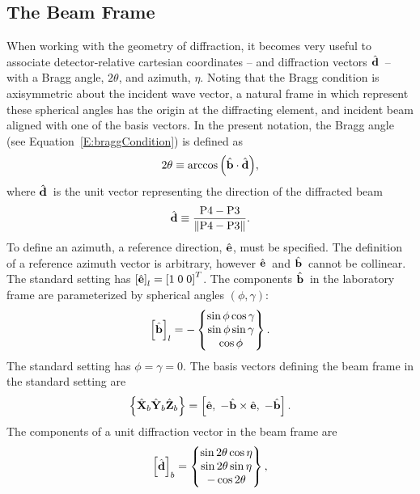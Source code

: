 \documentclass[12pt,letterpaper,final]{amsart}
\newcommand{\mbm}[1]{\ensuremath{\mbox{\boldmath$#1$}}}
\newcommand{\bhat}{\ensuremath{\hat{\mbm{\mathrm{b}}}}}
\newcommand{\dhat}{\ensuremath{\hat{\mbm{\mathrm{d}}}}}
\newcommand{\ehat}{\ensuremath{\hat{\mbm{\mathrm{e}}}}}
\newcommand{\Pthree}{\ensuremath{\mathrm{P3}}}
\newcommand{\Pfour}{\ensuremath{\mathrm{P4}}}
\newcommand{\Xb}{\ensuremath{\hat{\mbm{\mathrm{X}}}_b}}
\newcommand{\Yb}{\ensuremath{\hat{\mbm{\mathrm{Y}}}_b}}
\newcommand{\Zb}{\ensuremath{\hat{\mbm{\mathrm{Z}}}_b}}
\newcommand{\beamframe}{\ensuremath{\left\{\Xb\Yb\Zb\right\}}}
\newcommand{\labcomps}[1]{\left[#1\right]_l}
\newcommand{\beamcomps}[1]{\left[#1\right]_b}
\newcommand{\eqnref}[1]{Equation~\ref{#1}}
\begin{document}
\subsection{The Beam Frame}
When working with the geometry of diffraction, it becomes very useful
to associate detector-relative cartesian coordinates -- and
diffraction vectors \dhat\ -- with a Bragg angle, $2\theta$, and
azimuth, $\eta$.  Noting that the Bragg condition is axisymmetric
about the incident wave vector, a natural frame in which represent
these spherical angles has the origin at the diffracting element, and
incident beam aligned with one of the basis vectors.  In the present
notation, the Bragg angle (see \eqnref{E:braggCondition}) is defined
as
\begin{equation}
  2\theta \equiv \arccos{\left( \bhat \cdot \dhat \right)},
\end{equation}
where \dhat\ is the unit vector representing the direction of the
diffracted beam
\begin{displaymath}
  \dhat \equiv \frac{\Pfour-\Pthree}{\|\Pfour-\Pthree\|}.
\end{displaymath}
To define an azimuth, a reference direction, \ehat, must be specified.
The definition of a reference azimuth vector is arbitrary, however
\ehat\ and \bhat\ cannot be collinear.  The standard setting has
$\labcomps{\ehat}=\left[1\;0\;0\right]^T$.  The components \bhat\ in
the laboratory frame are parameterized by spherical angles $(\phi,
\gamma)$:
\begin{equation}
  \labcomps{\bhat} = -\begin{Bmatrix}
    \sin\phi \cos\gamma \\
    \sin\phi \sin\gamma \\
    \cos\phi
  \end{Bmatrix}.
\end{equation}
The standard setting has $\phi=\gamma=0$.  The basis vectors defining
the beam frame in the standard setting are
\begin{equation}
  \beamframe = \left[ \ehat,\; -\bhat\times\ehat,\; -\bhat \right].
  \label{E:etaFrame}
\end{equation}
The components of a unit diffraction vector in the beam frame are
\begin{equation}
  \beamcomps{\dhat} = \begin{Bmatrix}
    \sin2\theta \cos\eta \\
    \sin2\theta \sin\eta \\
    -\cos2\theta
  \end{Bmatrix},
\end{equation}
\end{document}
